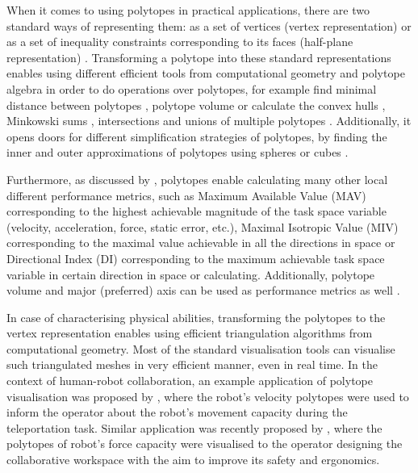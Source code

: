 When it comes to using polytopes in practical applications, there are two standard ways of representing them: as a set of vertices (vertex representation) or as a set of inequality constraints corresponding to its faces (half-plane representation) \cite{fukuda2004frequently}. Transforming a polytope into these standard representations enables using different efficient tools from computational geometry and polytope algebra in order to do operations over polytopes, for example find minimal distance between polytopes \cite{Ong1997gjk}, polytope volume \cite{Lawrence1991Volume} or calculate the convex hulls \cite{Barber1996}, Minkowski sums \cite{BARKI2009525}, intersections and unions of multiple polytopes \cite{Tiwary2008}. Additionally, it opens doors for different simplification strategies of polytopes, by finding the inner and outer approximations of polytopes using spheres \cite{Botkin1994} or cubes \cite{BEMPORAD2004151}.

Furthermore, as discussed by \citet{Finotello1998}, polytopes enable calculating many other local different performance metrics, such as Maximum Available Value (MAV) corresponding to the highest achievable magnitude of the task space variable (velocity, acceleration, force, static error, etc.), Maximal Isotropic Value (MIV) corresponding to the maximal value achievable in all the directions in space or Directional Index (DI) \cite{boschetti_minto_2023} corresponding to the maximum achievable task space variable in certain direction in space or calculating. Additionally, polytope volume and major (preferred) axis can be used as performance metrics as well \cite{chiacchio_global_1991, Long2018Evaluating}.

In case of characterising physical abilities, transforming the polytopes to the vertex representation enables using efficient triangulation algorithms from computational geometry. Most of the standard visualisation tools can visualise such triangulated meshes in very efficient manner, even in real time. 
In the context of human-robot collaboration, an example application of polytope visualisation was proposed by \citet{Zolotas2021}, where the  robot's velocity polytopes were used to inform the operator about the robot's movement capacity during the teleportation task. Similar application was recently proposed by \citet{Weistroffer2022Using}, where the polytopes  of robot's force capacity were visualised to the operator designing the collaborative workspace with the aim to improve its safety and ergonomics. 

